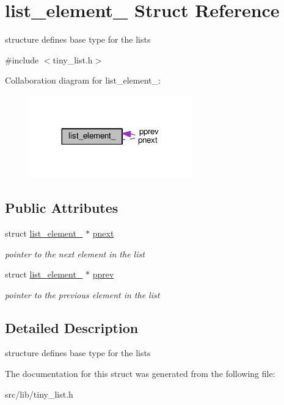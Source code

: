 \hypertarget{structlist__element__}{}\section{list\+\_\+element\+\_\+ Struct Reference}
\label{structlist__element__}


structure defines base type for the lists  




{\ttfamily \#include $<$tiny\+\_\+list.\+h$>$}



Collaboration diagram for list\+\_\+element\+\_\+\+:
\nopagebreak
\begin{figure}[H]
\begin{center}
\leavevmode
\includegraphics[width=200pt]{structlist__element____coll__graph}
\end{center}
\end{figure}
\subsection*{Public Attributes}
\begin{DoxyCompactItemize}
\item 
\hypertarget{structlist__element___a81cb2c54606be8120460bded0d919039}{}struct \hyperlink{structlist__element__}{list\+\_\+element\+\_\+} $\ast$ \hyperlink{structlist__element___a81cb2c54606be8120460bded0d919039}{pnext}\label{structlist__element___a81cb2c54606be8120460bded0d919039}

\begin{DoxyCompactList}\small\item\em pointer to the next element in the list \end{DoxyCompactList}\item 
\hypertarget{structlist__element___a0f6c573966c9d70d4a2ef19b73717515}{}struct \hyperlink{structlist__element__}{list\+\_\+element\+\_\+} $\ast$ \hyperlink{structlist__element___a0f6c573966c9d70d4a2ef19b73717515}{pprev}\label{structlist__element___a0f6c573966c9d70d4a2ef19b73717515}

\begin{DoxyCompactList}\small\item\em pointer to the previous element in the list \end{DoxyCompactList}\end{DoxyCompactItemize}


\subsection{Detailed Description}
structure defines base type for the lists 

The documentation for this struct was generated from the following file\+:\begin{DoxyCompactItemize}
\item 
src/lib/tiny\+\_\+list.\+h\end{DoxyCompactItemize}
